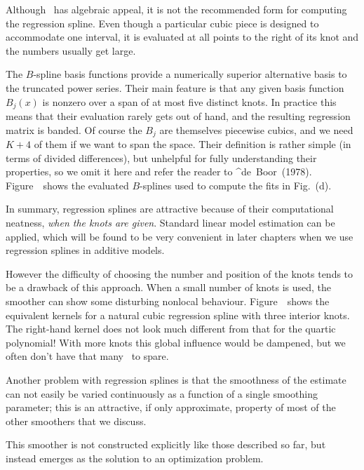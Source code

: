 Although \tpseries\ has algebraic appeal, it is not the recommended form for computing the regression spline. 
Even though a  particular cubic piece is designed to accommodate one interval, it is evaluated at all points to the right of its knot and the  numbers usually get large.

\par
The $B$-spline basis functions provide a numerically superior alternative basis to the truncated power series.
Their main feature is that any given basis function $B_j(x)$ is nonzero over a span of at most five distinct knots. 
In practice this means that their evaluation rarely gets out of hand, and the resulting regression matrix is banded.
 Of course the $B_j$ are themselves piecewise cubics, and we need $K+4$ of them if we want to span the space. 
Their definition is rather simple (in terms of divided differences), but unhelpful for fully understanding their properties, so we omit it here and refer the reader to ^{de~Boor~(1978)}.
Figure~\BSbasis\ shows the evaluated $B$-splines used to compute the fits in Fig.~\BS(d).

In summary, regression splines are attractive because of their computational neatness, {\sl when the knots are given}.
Standard linear model estimation can be applied, which will be found to be very convenient in later chapters when we use regression splines in additive models.

However the difficulty of choosing the number and position of the knots
tends to be a drawback of this approach.
When a small number of knots is used, the smoother can show some disturbing nonlocal behaviour. 
Figure~\hatplot\ shows the equivalent kernels for a natural cubic regression spline with three interior knots. 
The right-hand kernel does not look much different from that for the quartic polynomial! With more knots this global influence would be dampened, but we often don't  have that many \df\ to spare.

Another problem with regression splines is that the smoothness of the 
estimate can not easily be  varied continuously as a function of a single  smoothing
parameter; this is an attractive, if only approximate, property of most of the
other smoothers that we discuss.  

\Sectionskip
{}
This smoother is not constructed explicitly like those described so far, but instead emerges as the solution to an  optimization
problem.



